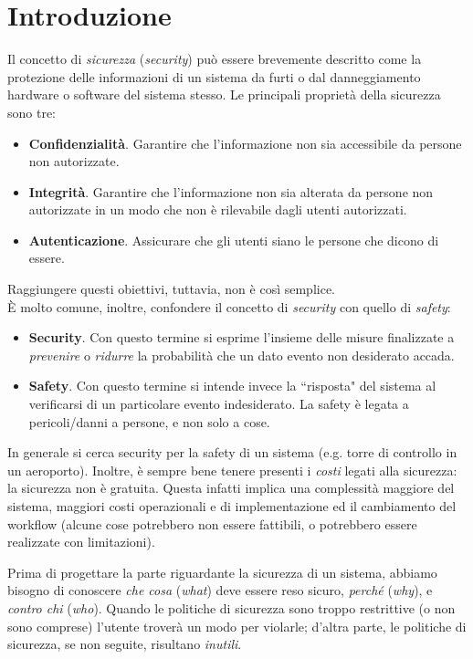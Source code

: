 \chapter{Introduzione}
Il concetto di \textit{sicurezza} (\textit{security}) può essere brevemente descritto come la protezione delle informazioni di un sistema da furti o dal danneggiamento hardware o software del sistema stesso. Le principali proprietà della sicurezza sono tre:
\begin{itemize}
	\item \textbf{Confidenzialità}. Garantire che l'informazione non sia accessibile da persone non autorizzate.
	\item \textbf{Integrità}. Garantire che l'informazione non sia alterata da persone non autorizzate in un modo che non è rilevabile dagli utenti autorizzati.
	\item \textbf{Autenticazione}. Assicurare che gli utenti siano le persone che dicono di essere.
\end{itemize}
Raggiungere questi obiettivi, tuttavia, non è così semplice.\\
È molto comune, inoltre, confondere il concetto di \textit{security} con quello di \textit{safety}:
\begin{itemize}
	\item \textbf{Security}. Con questo termine si esprime l’insieme delle misure finalizzate a \textit{prevenire} o \textit{ridurre} la probabilità che un dato evento non desiderato accada.
	\item \textbf{Safety}. Con questo termine si intende invece la \textquotedblleft risposta" del sistema al verificarsi di un particolare evento indesiderato. La safety è legata a pericoli/danni a persone, e non solo a cose.
\end{itemize}
In generale si cerca security per la safety di un sistema (e.g. torre di controllo in un aeroporto). Inoltre, è sempre bene tenere presenti i \textit{costi} legati alla sicurezza: la sicurezza non è gratuita. Questa infatti implica una complessità maggiore del sistema, maggiori costi operazionali e di implementazione ed il cambiamento del workflow (alcune cose potrebbero non essere fattibili, o potrebbero essere realizzate con limitazioni).

Prima di progettare la parte riguardante la sicurezza di un sistema, abbiamo bisogno di conoscere \textit{che cosa} (\textit{what}) deve essere reso sicuro, \textit{perché} (\textit{why}), e \textit{contro chi} (\textit{who}). Quando le politiche di sicurezza sono troppo restrittive (o non sono comprese) l'utente troverà un modo per violarle; d'altra parte, le politiche di sicurezza, se non seguite, risultano \textit{inutili}.

